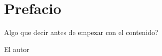 \chapter{Prefacio}

Algo que decir antes de empezar con el contenido?

\thispagestyle{plain}

\begin{flushright}
El autor
\end{flushright}
